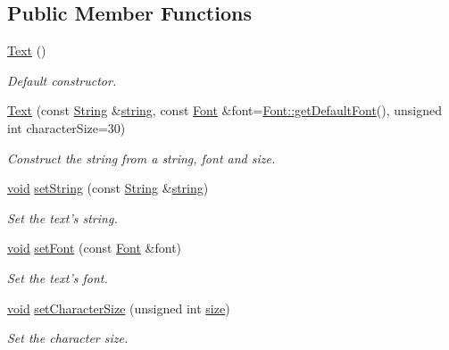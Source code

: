 \subsection*{Public Member Functions}
\begin{DoxyCompactItemize}
\item 
\hyperlink{classsf_1_1_text_aff7cab6a92e5948c9d1481cb2d87eb84}{Text} ()
\begin{DoxyCompactList}\small\item\em Default constructor. \end{DoxyCompactList}\item 
\hyperlink{classsf_1_1_text_a921ceeb09ced0f92ea7a675020557f61}{Text} (const \hyperlink{classsf_1_1_string}{String} \&\hyperlink{gl3_8h_ac83513893df92266f79a515488701770}{string}, const \hyperlink{classsf_1_1_font}{Font} \&font=\hyperlink{classsf_1_1_font_a88fc3372800948a1f8655c533cb8a952}{Font\-::get\-Default\-Font}(), unsigned int character\-Size=30)
\begin{DoxyCompactList}\small\item\em Construct the string from a string, font and size. \end{DoxyCompactList}\item 
\hyperlink{glutf90_8h_ac778d6f63f1aaf8ebda0ce6ac821b56e}{void} \hyperlink{classsf_1_1_text_a7d3b3359f286fd9503d1ced25b7b6c33}{set\-String} (const \hyperlink{classsf_1_1_string}{String} \&\hyperlink{gl3_8h_ac83513893df92266f79a515488701770}{string})
\begin{DoxyCompactList}\small\item\em Set the text's string. \end{DoxyCompactList}\item 
\hyperlink{glutf90_8h_ac778d6f63f1aaf8ebda0ce6ac821b56e}{void} \hyperlink{classsf_1_1_text_a2927805d1ae92d57f15034ea34756b81}{set\-Font} (const \hyperlink{classsf_1_1_font}{Font} \&font)
\begin{DoxyCompactList}\small\item\em Set the text's font. \end{DoxyCompactList}\item 
\hyperlink{glutf90_8h_ac778d6f63f1aaf8ebda0ce6ac821b56e}{void} \hyperlink{classsf_1_1_text_ae96f835fc1bff858f8a23c5b01eaaf7e}{set\-Character\-Size} (unsigned int \hyperlink{gl3_8h_a79ef9eb3e59c4bb34c4b9fbeb8d28ff7}{size})
\begin{DoxyCompactList}\small\item\em Set the character size. \end{DoxyCompactList}\item 

\end{DoxyCompactItemize}
